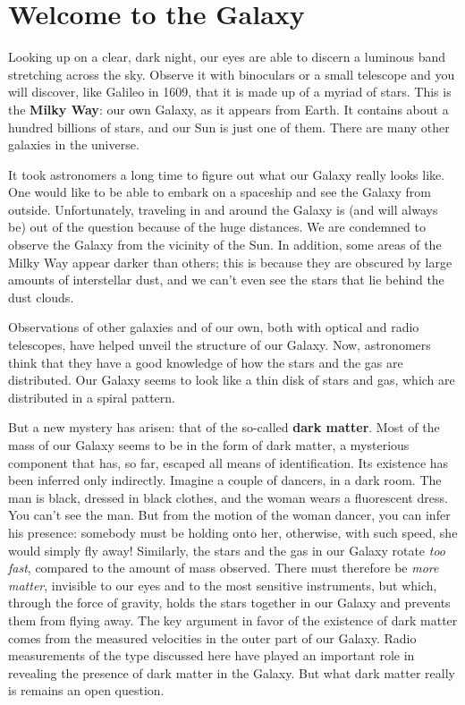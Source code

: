 \chapter{Welcome to the Galaxy}

Looking up on a clear, dark night, our eyes are able to discern a
luminous band stretching across the sky.  Observe it with  
binoculars or a small telescope and you will discover, like Galileo in
1609, that it is made up of a myriad of stars.  This is the {\bf Milky
Way}: our own Galaxy, as it appears from Earth.  It contains about a  
hundred billions of stars, and our Sun is just one of them. There are
many other galaxies in the universe.

It took astronomers a long time to figure out what our Galaxy really
looks like.  One would like to be able to embark on a spaceship and
see the Galaxy from outside.  Unfortunately, traveling in and around
the Galaxy is (and will always be) out of the question because of the huge
distances.  We are condemned to observe the Galaxy from the vicinity
of the Sun.  In addition, some areas of the Milky Way appear darker
than others; this is because they are obscured by large amounts of
interstellar dust, and we can't even see the stars that lie behind the
dust clouds.

Observations of other galaxies and of our own, both with optical and
radio telescopes, have helped unveil the structure of our Galaxy.
Now, astronomers think that they have a good knowledge of how the
stars and the gas are distributed.  Our Galaxy seems to look like a
thin disk of stars and gas, which are distributed in a spiral pattern.

But a new mystery has arisen: that of the so-called {\bf dark matter}.
Most of the mass of our Galaxy seems to be in the form of dark matter,
a mysterious component that has, so far, escaped all means of
identification.  Its existence has been inferred only indirectly. Imagine a
couple of dancers, in a dark room. The man is black, dressed in black
clothes, and the woman wears a fluorescent dress. You can't see the
man. But from the motion of the woman dancer, you can infer his
presence: somebody must be holding onto her, otherwise, with such
speed, she would simply fly away!  Similarly, the stars and the gas in
our Galaxy rotate {\em too fast}, compared to the amount of mass
observed. There must therefore be {\em more matter}, invisible to our eyes
and to the most sensitive instruments, but which, through the force of
gravity, holds the stars together in our Galaxy and prevents them from
flying away. The key argument in favor of the existence of dark
matter comes from the measured velocities in the outer part of our
Galaxy.  Radio measurements of the type discussed here have played an
important role in revealing the presence of dark matter in the
Galaxy. But what dark matter really is remains an open question.

